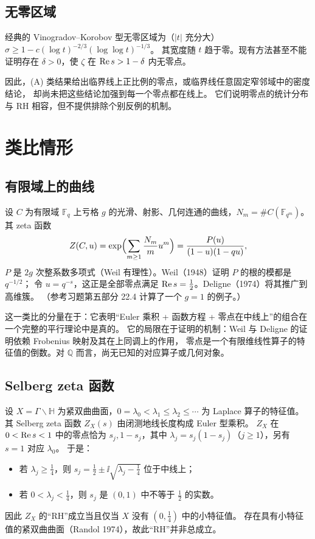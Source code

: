 \documentclass[11pt]{article}
\begin{document}
\subsection{无零区域}
经典的 Vinogradov--Korobov 型无零区域为（$|t|$ 充分大）
$\sigma\ge1-c(\log t)^{-2/3}(\log\log t)^{-1/3}$。
其宽度随 $t$ 趋于零。现有方法甚至不能证明存在 $\delta>0$，使 $\zeta$ 在 $\operatorname{Re} s>1-\delta$ 内无零点。

因此，(A) 类结果给出临界线上正比例的零点，或临界线任意固定窄邻域中的密度结论，
却尚未把这些结论加强到每一个零点都在线上。
它们说明零点的统计分布与 RH 相容，但不提供排除个别反例的机制。

\section{类比情形}
\subsection{有限域上的曲线}
设 $C$ 为有限域 $\mathbb F_q$ 上亏格 $g$ 的光滑、射影、几何连通的曲线，$N_m=\#C(\mathbb F_{q^m})$。其 zeta 函数
\[
 Z(C,u)=\exp\Bigl(\sum_{m\ge1}\frac{N_m}{m}u^m\Bigr)=\frac{P(u)}{(1-u)(1-qu)},
\]
$P$ 是 $2g$ 次整系数多项式（Weil 有理性）。Weil（1948）证明 $P$ 的根的模都是 $q^{-1/2}$；
令 $u=q^{-s}$，这正是全部零点满足 $\operatorname{Re} s=\tfrac12$。Deligne（1974）将其推广到高维簇。
（参考习题第五部分 22.4 计算了一个 $g=1$ 的例子。）

这一类比的分量在于：它表明“Euler 乘积 + 函数方程 + 零点在中线上”的组合在一个完整的平行理论中是真的。
它的局限在于证明的机制：Weil 与 Deligne 的证明依赖 Frobenius 映射及其在上同调上的作用，
零点是一个有限维线性算子的特征值的倒数。对 $\mathbb Q$ 而言，尚无已知的对应算子或几何对象。

\subsection{Selberg zeta 函数}
设 $X=\Gamma\backslash\mathbb H$ 为紧双曲曲面，$0=\lambda_0<\lambda_1\le\lambda_2\le\cdots$ 为 Laplace 算子的特征值。
其 Selberg zeta 函数 $Z_X(s)$ 由闭测地线长度构成 Euler 型乘积。
$Z_X$ 在 $0<\operatorname{Re} s<1$ 中的零点恰为 $s_j,1-s_j$，其中 $\lambda_j=s_j(1-s_j)$（$j\ge1$），另有 $s=1$ 对应 $\lambda_0$。
于是：
\begin{itemize}
 \item 若 $\lambda_j\ge\tfrac14$，则 $s_j=\tfrac12\pm\ii\sqrt{\lambda_j-\tfrac14}$ 位于中线上；
 \item 若 $0<\lambda_j<\tfrac14$，则 $s_j$ 是 $(0,1)$ 中不等于 $\tfrac12$ 的实数。
\end{itemize}
因此 $Z_X$ 的“RH”成立当且仅当 $X$ 没有 $(0,\tfrac14)$ 中的小特征值。
存在具有小特征值的紧双曲曲面（Randol 1974），故此“RH”并非总成立。
\end{document}
